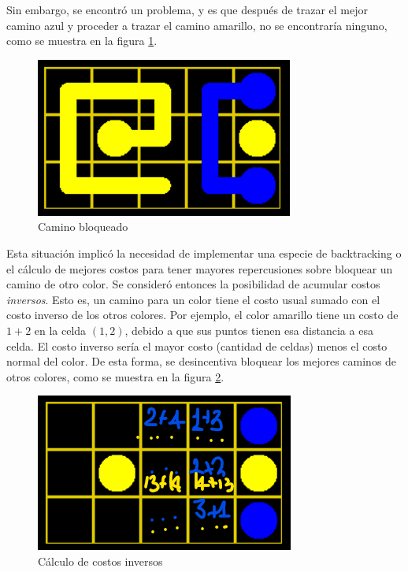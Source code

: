 \documentclass[letter,12pt]{article}
\begin{document}
Sin embargo, se encontró un problema, y es que después de trazar el mejor camino azul y proceder a trazar el camino amarillo, no se encontraría ninguno, como se muestra en la figura \ref{fig:grid_algo3}. \par

\begin{figure}[ht!]
    \centering
    \includegraphics[scale=0.7]{img/grid_algo3.png}
    \vspace{-0.5em}
    \caption{Camino bloqueado}
    \label{fig:grid_algo3}
\end{figure}

Esta situación implicó la necesidad de implementar una especie de backtracking o el cálculo de mejores costos para tener mayores repercusiones sobre bloquear un camino de otro color. Se consideró entonces la posibilidad de acumular costos \textit{inversos}. Esto es, un camino para un color tiene el costo usual sumado con el costo inverso de los otros colores. Por ejemplo, el color amarillo tiene un costo de $1 + 2$ en la celda $(1,2)$, debido a que sus puntos tienen esa distancia a esa celda. El costo inverso sería el mayor costo (cantidad de celdas) menos el costo normal del color. De esta forma, se desincentiva bloquear los mejores caminos de otros colores, como se muestra en la figura \ref{fig:grid_algo4}. \par

\begin{figure}[ht!]
    \centering
    \includegraphics[scale=0.7]{img/grid_algo4.png}
    \vspace{-0.5em}
    \caption{Cálculo de costos inversos}
    \label{fig:grid_algo4}
\end{figure}
\end{document}
